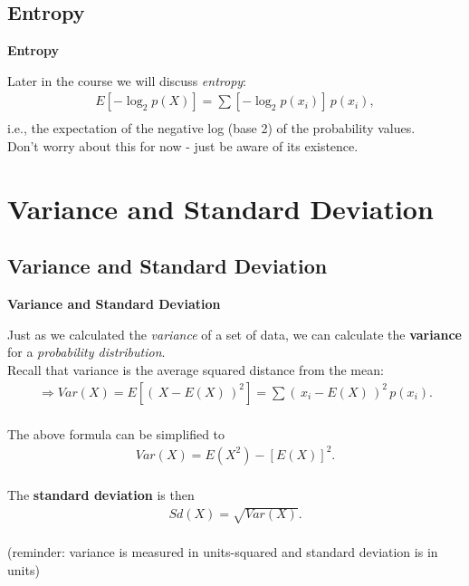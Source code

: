 \documentclass[compress]{beamer}        %
\makeatletter
\newcommand{\tcb}{\textcolor{beamer@blendedblue}}
\makeatother
\begin{document}
\subsection{Entropy}
\begin{frame}{\bf \tcb{Entropy}}

Later in the course we will discuss \emph{entropy}:\\
\begin{align*}
E[-\log_2 p(X)] = \sum [-\log_2 p(x_i)] \, p(x_i),\\[-0.2cm]
\end{align*}
i.e., the expectation of the negative log (base 2) of the probability values.\\[1cm]

Don't worry about this for now - just be aware of its existence.


\end{frame}






\section{Variance and Standard Deviation}
\subsection{Variance and Standard Deviation}
\begin{frame}{\bf \tcb{Variance and Standard Deviation}}

Just as we calculated the \emph{variance} of a set of data, we can calculate the {\bf variance} for a \emph{probability distribution}.\\[0.4cm]

Recall that variance is the average squared distance from the mean:
\begin{align*}
\Rightarrow Var(X) =  E[(\,X-E(X)\,)^2] = \sum (\,x_i-E(X)\,)^2 \, p(x_i).\\
\end{align*}

The above formula can be simplified to\\[-0.5cm]
\begin{align*}
\boxed{Var(X) = E(X^2) - [E(X)]^2}.\\[-0.2cm]
\end{align*}

The {\bf standard deviation} is then
\begin{align*}
\boxed{Sd(X) = \sqrt{Var(X)}}.\\[-0.3cm]
\end{align*}

{\footnotesize(reminder: variance is measured in units-squared and standard deviation is in units)}

\end{frame}
\end{document}
